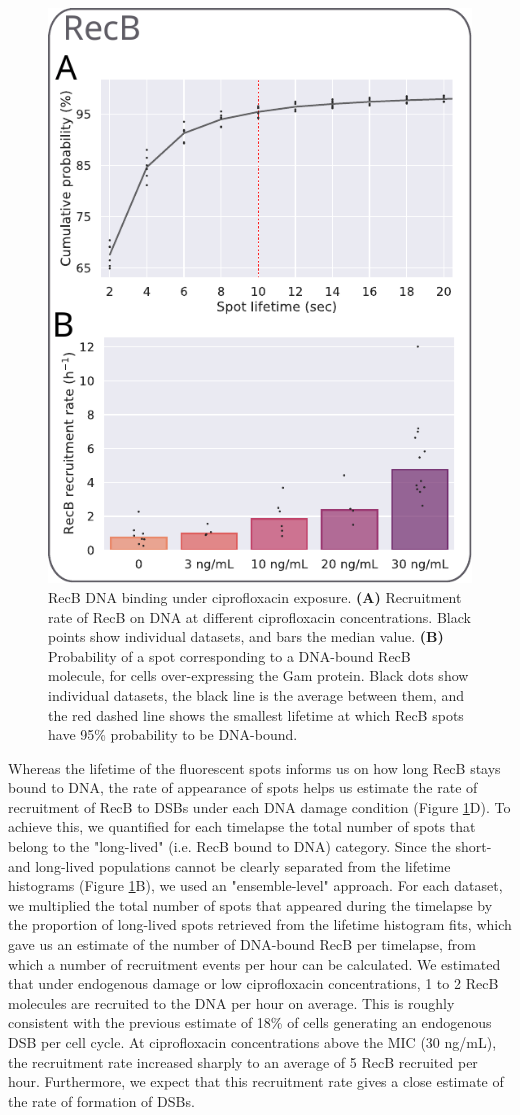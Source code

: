 \begin{figure}[htbp]
    \centering
    \includegraphics[width=.4\textwidth]{Figures/Fig2_RecB_recruitment.pdf}
    \caption{RecB DNA binding under ciprofloxacin exposure. \textbf{(A)} Recruitment rate of RecB on DNA at different ciprofloxacin concentrations. Black points show individual datasets, and bars the median value. \textbf{(B)}  Probability of a spot corresponding to a DNA-bound RecB molecule, for cells over-expressing the Gam protein. Black dots show individual datasets, the black line is the average between them, and the red dashed line shows the smallest lifetime at which RecB spots have 95\% probability to be DNA-bound.}
    \label{Fig:recruitment}
\end{figure}

Whereas the lifetime of the fluorescent spots informs us on how long RecB stays bound to DNA, the rate of appearance of spots helps us estimate the rate of recruitment of RecB to DSBs under each DNA damage condition (Figure \ref{Fig:recruitment}D). To achieve this, we quantified for each timelapse the total number of spots that belong to the "long-lived" (i.e. RecB bound to DNA) category. Since the short- and long-lived populations cannot be clearly separated from the lifetime histograms (Figure \ref{Fig:recruitment}B), we used an "ensemble-level" approach. For each dataset, we multiplied the total number of spots that appeared during the timelapse by the proportion of long-lived spots retrieved from the lifetime histogram fits, which gave us an estimate of the number of DNA-bound RecB per timelapse, from which a number of recruitment events per hour can be calculated. We estimated that under endogenous damage or low ciprofloxacin concentrations, 1 to 2 RecB molecules are recruited to the DNA per hour on average. This is roughly consistent with the previous estimate of 18\% of cells generating an endogenous DSB per cell cycle\cite{Sinha2018}. At ciprofloxacin concentrations above the MIC (30 ng/mL), the recruitment rate increased sharply to an average of 5 RecB recruited per hour. Furthermore, we expect that this recruitment rate gives a close estimate of the rate of formation of DSBs.

